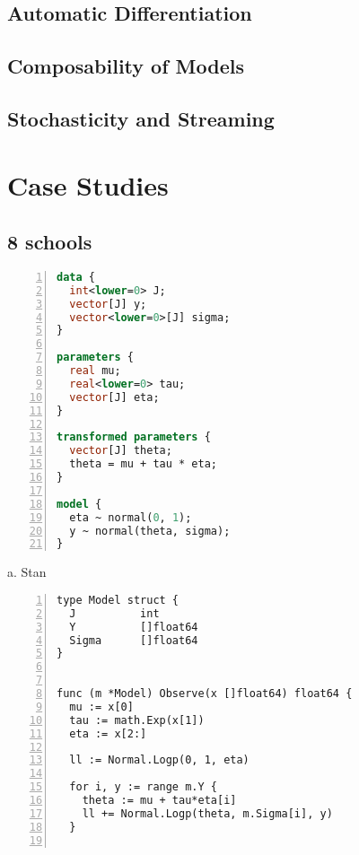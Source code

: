 \documentclass[sigplan,review,10pt,anonymous]{acmart}
\begin{document}
\begin{sloppypar}
\subsection{Automatic Differentiation}

\subsection{Composability of Models}

\subsection{Stochasticity and Streaming}

\section{Case Studies}
\label{sec:case-studies}

\subsection{8 schools}

\begin{figure*}
	\begin{minipage}{0.45\textwidth}
	\begin{lstlisting}[language=Stan,framexleftmargin=10pt,numbers=left]
data {
  int<lower=0> J;
  vector[J] y;
  vector<lower=0>[J] sigma;
}

parameters {
  real mu;
  real<lower=0> tau;
  vector[J] eta;
}

transformed parameters {
  vector[J] theta;
  theta = mu + tau * eta;
}

model {
  eta ~ normal(0, 1);
  y ~ normal(theta, sigma);
}
\end{lstlisting}

\centering
a. Stan
	\end{minipage}
	\hfill
	\begin{minipage}{0.45\textwidth}
\begin{lstlisting}[framexleftmargin=10pt,numbers=left]
type Model struct {
  J          int
  Y          []float64
  Sigma      []float64
}


func (m *Model) Observe(x []float64) float64 {
  mu := x[0]
  tau := math.Exp(x[1])
  eta := x[2:]

  ll := Normal.Logp(0, 1, eta)

  for i, y := range m.Y {
    theta := mu + tau*eta[i]
    ll += Normal.Logp(theta, m.Sigma[i], y)
  }


\end{lstlisting}
\end{minipage}
\end{figure*}
\end{sloppypar}
\end{document}
